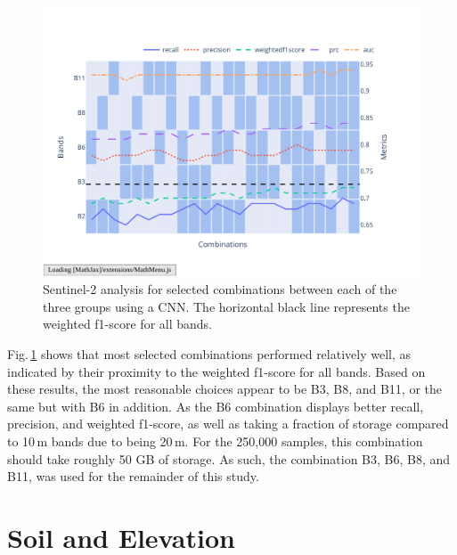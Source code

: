 \begin{figure}[ht]
    \centering
    \includegraphics[width=0.98\linewidth, trim={20pt 40pt 10pt 30pt}, clip]{figures/figures_analysis/band_selection_further.pdf}
    \caption{Sentinel-2 analysis for selected combinations between each of the three groups using a CNN. The horizontal black line represents the weighted f1-score for all bands.}
    \label{fig:band_selection_further}
\end{figure}

Fig.\,\ref{fig:band_selection_further} shows that most selected combinations performed relatively well, as indicated by their proximity to the weighted f1-score for all bands. Based on these results, the most reasonable choices appear to be B3, B8, and B11, or the same but with B6 in addition. As the B6 combination displays better recall, precision, and weighted f1-score, as well as taking a fraction of storage compared to 10\,m bands due to being 20\,m. For the 250,000 samples, this combination should take roughly 50 GB of storage. As such, the combination B3, B6, B8, and B11, was used for the remainder of this study.

\section{Soil and Elevation}

